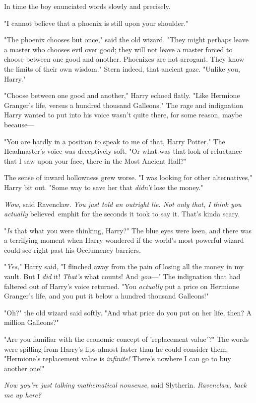 In time the boy enunciated words slowly and precisely.

"I cannot believe that a phoenix is still upon your shoulder."

"The phoenix chooses but once," said the old wizard. "They might perhaps leave 
a master who chooses evil over good; they will not leave a master forced to 
choose between one good and another. Phoenixes are not arrogant. They know the 
limits of their own wisdom." Stern indeed, that ancient gaze. "Unlike you, 
Harry."

"Choose between one good and another," Harry echoed flatly. "Like Hermione 
Granger's life, versus a hundred thousand Galleons." The rage and indignation 
Harry wanted to put into his voice wasn't quite there, for some reason, maybe 
because---

"You are hardly in a position to speak to me of that, Harry Potter." The 
Headmaster's voice was deceptively soft. "Or what was that look of reluctance 
that I saw upon your face, there in the Most Ancient Hall?"

The sense of inward hollowness grew worse. "I was looking for other 
alternatives," Harry bit out. "Some way to save her that \emph{didn't} lose the 
money."

\emph{Wow,} said Ravenclaw. \emph{You just told an outright lie. Not only that, 
I think you actually} believed\ emph{it for the seconds it took to say it. 
That's kinda scary.}

"\emph{Is} that what you were thinking, Harry?" The blue eyes were keen, and 
there was a terrifying moment when Harry wondered if the world's most powerful 
wizard could see right past his Occlumency barriers.

"\emph{Yes,}" Harry said, "I flinched away from the pain of losing all the 
money in my vault. But I \emph{did} it! \emph{That's} what counts! And 
\emph{you}---" The indignation that had faltered out of Harry's voice returned. 
"You \emph{actually} put a price on Hermione Granger's life, and you put it 
below a hundred thousand Galleons!"

"Oh?" the old wizard said softly. "And what price do you put on her life, then? 
A million Galleons?"

"Are you familiar with the economic concept of 'replacement value'?" The words 
were spilling from Harry's lips almost faster than he could consider them. 
"Hermione's replacement value is \emph{infinite!} There's nowhere I can go to 
buy another one!"

\emph{Now you're just talking mathematical nonsense,} said Slytherin. 
\emph{Ravenclaw, back me up here?}

